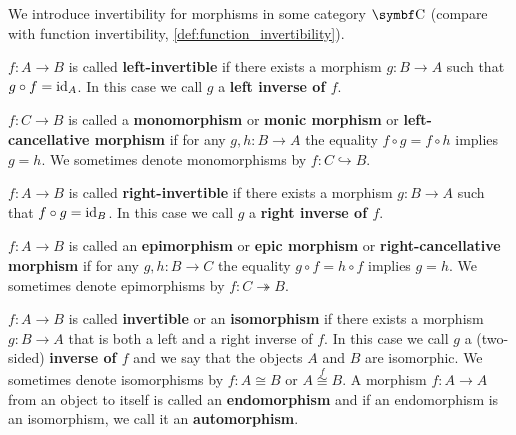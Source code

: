 \begin{definition}\label{def:morphism_invertibility}
  We introduce invertibility for morphisms in some category \( \Bold C \) (compare with function invertibility, \cref{def:function_invertibility}).

  \begin{defenum}
     \( f: A \to B \) is called \textbf{left-invertible} if there exists a morphism \( g: B \to A \) such that \( g \circ f = \operatorname{id}_A \). In this case we call \( g \) a \textbf{left inverse of \( f \)}.

     \( f: C \to B \) is called a \textbf{monomorphism} or \textbf{monic morphism} or \textbf{left-cancellative morphism} if for any \( g, h: B \to A \) the equality \( f \circ g = f \circ h \) implies \( g = h \). We sometimes denote monomorphisms by \( f: C \hookrightarrow B \).

     \( f: A \to B \) is called \textbf{right-invertible} if there exists a morphism \( g: B \to A \) such that \( f \circ g = \operatorname{id}_B \). In this case we call \( g \) a \textbf{right inverse of \( f \)}.

     \( f: A \to B \) is called an \textbf{epimorphism} or \textbf{epic morphism} or \textbf{right-cancellative morphism} if for any \( g, h: B \to C \) the equality \( g \circ f = h \circ f \) implies \( g = h \). We sometimes denote epimorphisms by \( f: C \twoheadrightarrow B \).

     \( f: A \to B \) is called \textbf{invertible} or an \textbf{isomorphism} if there exists a morphism \( g: B \to A \) that is both a left and a right inverse of \( f \). In this case we call \( g \) a (two-sided) \textbf{inverse of \( f \)} and we say that the objects \( A \) and \( B \) are isomorphic. We sometimes denote isomorphisms by \( f: A \cong B \) or \( A \overset f \cong B \). A morphism \( f: A \to A \) from an object to itself is called an \textbf{endomorphism} and if an endomorphism is an isomorphism, we call it an \textbf{automorphism}.
  \end{defenum}
\end{definition}


